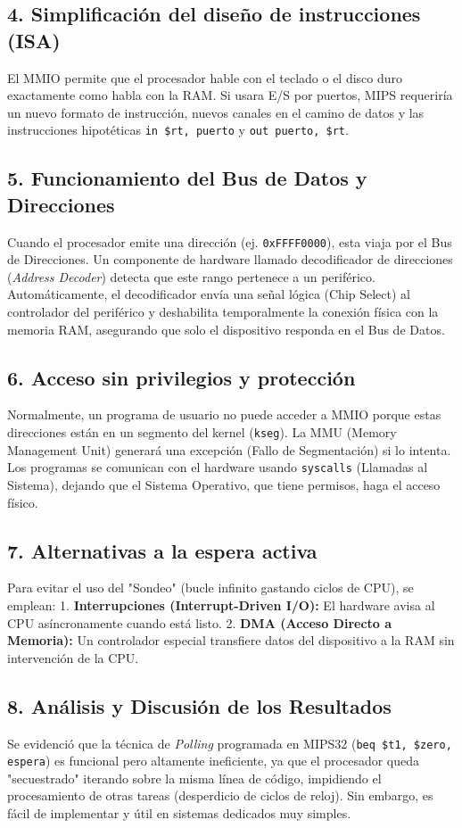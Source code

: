 \documentclass[12pt, a4paper]{article}
\begin{document}
\subsection{4. Simplificación del diseño de instrucciones (ISA)}
El MMIO permite que el procesador hable con el teclado o el disco duro exactamente como habla con la RAM. Si usara E/S por puertos, MIPS requeriría un nuevo formato de instrucción, nuevos canales en el camino de datos y las instrucciones hipotéticas \texttt{in \$rt, puerto} y \texttt{out puerto, \$rt}.

\subsection{5. Funcionamiento del Bus de Datos y Direcciones}
Cuando el procesador emite una dirección (ej. \texttt{0xFFFF0000}), esta viaja por el Bus de Direcciones. Un componente de hardware llamado decodificador de direcciones (\textit{Address Decoder}) detecta que este rango pertenece a un periférico. Automáticamente, el decodificador envía una señal lógica (Chip Select) al controlador del periférico y deshabilita temporalmente la conexión física con la memoria RAM, asegurando que solo el dispositivo responda en el Bus de Datos.

\subsection{6. Acceso sin privilegios y protección}
Normalmente, un programa de usuario no puede acceder a MMIO porque estas direcciones están en un segmento del kernel (\texttt{kseg}). La MMU (Memory Management Unit) generará una excepción (Fallo de Segmentación) si lo intenta. Los programas se comunican con el hardware usando \texttt{syscalls} (Llamadas al Sistema), dejando que el Sistema Operativo, que tiene permisos, haga el acceso físico.

\subsection{7. Alternativas a la espera activa}
Para evitar el uso del "Sondeo" (bucle infinito gastando ciclos de CPU), se emplean:
1. \textbf{Interrupciones (Interrupt-Driven I/O):} El hardware avisa al CPU asíncronamente cuando está listo.
2. \textbf{DMA (Acceso Directo a Memoria):} Un controlador especial transfiere datos del dispositivo a la RAM sin intervención de la CPU.

\subsection{8. Análisis y Discusión de los Resultados}
Se evidenció que la técnica de \textit{Polling} programada en MIPS32 (\texttt{beq \$t1, \$zero, espera}) es funcional pero altamente ineficiente, ya que el procesador queda "secuestrado" iterando sobre la misma línea de código, impidiendo el procesamiento de otras tareas (desperdicio de ciclos de reloj). Sin embargo, es fácil de implementar y útil en sistemas dedicados muy simples.
\end{document}
